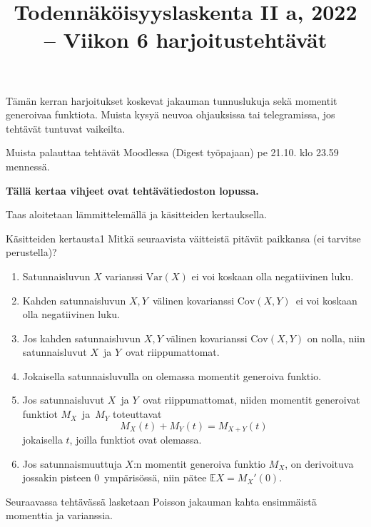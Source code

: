 \documentclass[11pt,a4paper]{amsart}
\title{Todennäköisyyslaskenta II a, 2022 -- Viikon 6 harjoitustehtävät}
\newcommand{\E}{\mathbb{E}}
\newcommand{\1}{\mathbf{1}}
\begin{document}
\maketitle

Tämän kerran harjoitukset koskevat jakauman tunnuslukuja sekä momentit generoivaa funktiota. Muista kysyä neuvoa ohjauksissa tai telegramissa, jos tehtävät tuntuvat vaikeilta. 

Muista palauttaa tehtävät Moodlessa (Digest työpajaan) pe 21.10. klo 23.59 mennessä.


{\bf Tällä kertaa vihjeet ovat tehtävätiedoston lopussa.}
\medskip 

Taas aloitetaan lämmittelemällä ja käsitteiden kertauksella. 
\begin{Exercises}{Käsitteiden kertausta}{1}
Mitkä seuraavista väitteistä pitävät paikkansa (ei tarvitse perustella)? 
\begin{enumerate}
\item Satunnaisluvun $X$ varianssi $\mathrm{Var}(X)$ ei voi koskaan olla negatiivinen luku.

\item Kahden satunnaisluvun $X,Y$ välinen kovarianssi $\mathrm{Cov}(X,Y)$ ei voi koskaan olla negatiivinen luku.


\item Jos kahden satunnaisluvun $X,Y$ välinen kovarianssi $\mathrm{Cov}(X,Y)$ on nolla, niin satunnaisluvut $X$ ja $Y$ ovat riippumattomat. 


\item Jokaisella satunnaisluvulla on olemassa momentit generoiva funktio. 


\item  Jos satunnaisluvut $X$ ja $Y$ ovat riippumattomat, niiden momentit generoivat funktiot $M_X$ ja $M_Y$ toteuttavat
\[
M_X(t)+M_Y(t)=M_{X+Y}(t)
\] 
jokaisella $t$, joilla funktiot ovat olemassa.


\item Jos satunnaismuuttuja $X$:n momentit generoiva funktio $M_X$, on derivoituva jossakin pisteen $0$ ympärisössä, niin pätee $\E X=M_X'(0)$.


\end{enumerate}
\end{Exercises}

Seuraavassa tehtävässä lasketaan Poisson jakauman kahta ensimmäistä momenttia ja varianssia.
\end{document}
